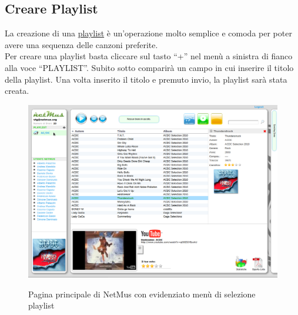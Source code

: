 \subsection*{Creare Playlist}

La creazione di una \underline{playlist} \`e un'operazione molto semplice e
comoda per poter avere una sequenza delle canzoni preferite.\\
Per creare una playlist basta cliccare sul tasto ``+'' nel men\`u a sinistra di
fianco alla voce ``PLAYLIST''. Subito sotto comparir\`a un campo in cui
inserire il titolo della playlist. Una volta inserito il titolo e premuto invio,
la playlist sar\`a stata creata.\\
\begin{figure}[htbp]
  \centering
  \includegraphics[width=15cm]{img/MU/new_playlist.png}\\
\caption{Pagina principale di NetMus con evidenziato men\`u di selezione
playlist}
\end{figure}
 

